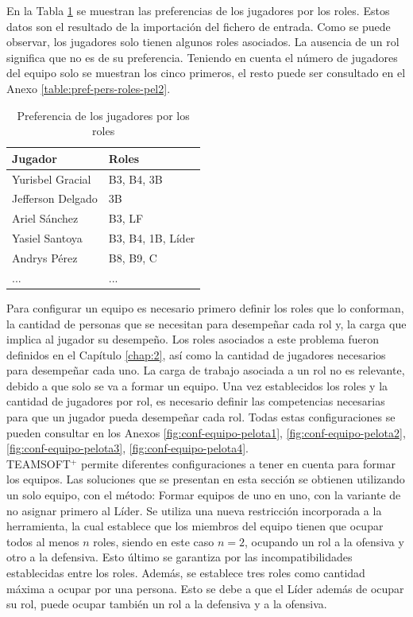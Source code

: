 En la Tabla \ref{table:pref-pers-roles-pel} se muestran las preferencias de los jugadores por los roles. Estos datos son el resultado de la importación del fichero de entrada. Como se puede observar, los jugadores solo tienen algunos roles asociados. La ausencia de un rol significa que no es de su preferencia. Teniendo en cuenta el número de jugadores del equipo solo se muestran los cinco primeros, el resto puede ser consultado en el Anexo \ref{table:pref-pers-roles-pel2}.

\begin{table}[H]
	\centering
	\caption{Preferencia de los jugadores por los roles}\label{table:pref-pers-roles-pel}
		\begin{tabular}{l l }
			\toprule
			\textbf{Jugador}  & \textbf{Roles}             \\ \midrule
			Yurisbel Gracial  & B3, B4, 3B        \\ \hline
			Jefferson Delgado & 3B                \\ \hline
			Ariel Sánchez     & B3, LF            \\ \hline
			Yasiel Santoya    & B3, B4, 1B, Líder \\ \hline
			Andrys Pérez      & B8, B9, C         \\ \hline
			...               & ...               \\ \bottomrule
		\end{tabular}
\end{table}

Para configurar un equipo es necesario primero definir los roles que lo conforman, la cantidad de personas que se necesitan para desempeñar cada rol y, la carga que implica al jugador su desempeño. Los roles asociados a este problema fueron definidos en el Capítulo \ref{chap:2}, así como la cantidad de jugadores necesarios para desempeñar cada uno. La carga de trabajo asociada a un rol no es relevante, debido a que solo se va a formar un equipo. Una vez establecidos los roles y la cantidad de jugadores por rol, es necesario definir las competencias necesarias para que un jugador pueda desempeñar cada rol. Todas estas configuraciones se pueden consultar en los Anexos \ref{fig:conf-equipo-pelota1}, \ref{fig:conf-equipo-pelota2}, \ref{fig:conf-equipo-pelota3}, \ref{fig:conf-equipo-pelota4}. \\

TEAMSOFT$^+$ permite diferentes configuraciones a tener en cuenta para formar los equipos. Las soluciones que se presentan en esta sección se obtienen utilizando un solo equipo, con el método: Formar equipos de uno en uno, con la variante de no asignar primero al Líder. Se utiliza una nueva restricción  incorporada a la herramienta, la cual establece que los miembros del equipo tienen que ocupar todos al menos $n$ roles, siendo en este caso $n=2$, ocupando un rol a la ofensiva y otro a la defensiva. Esto último se garantiza por las incompatibilidades establecidas entre los roles. Además, se establece tres roles como cantidad máxima a ocupar por una persona. Esto se debe a que el Líder además de ocupar su rol, puede ocupar también un rol a la defensiva y a la ofensiva.

